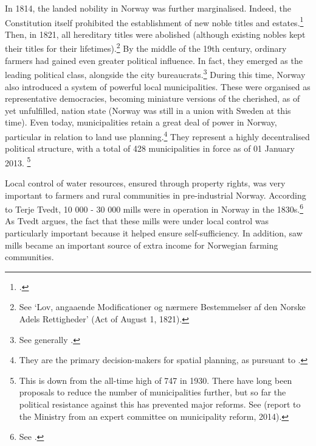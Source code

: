 In 1814, the landed nobility in Norway was further marginalised. Indeed, the Constitution itself prohibited the establishment of new noble titles and estates.\footcite[23|118]{c14} Then, in 1821, all hereditary titles were abolished (although existing nobles kept their titles for their lifetimes).\footnote{See `Lov, angaaende Modificationer og nærmere Bestemmelser af den Norske Adels Rettigheder' (Act of August 1, 1821).} By the middle of the 19th century, ordinary farmers had gained even greater political influence. In fact, they emerged as the leading political class, alongside the city bureaucrats.\footnote{See generally \cite{hommerstad14}.} During this time, Norway also introduced a system of powerful local municipalities. These were organised as representative democracies, becoming miniature versions of the cherished, as of yet unfulfilled, nation state (Norway was still in a union with Sweden at this time). Even today, municipalities retain a great deal of power in Norway, particular in relation to land use planning.\footnote{They are the primary decision-makers for spatial planning, as pursuant to \cite{pb08}.} They represent a highly decentralised political structure, with a total of 428 municipalities in force as of 01 January 2013. \footnote{This is down from the all-time high of 747 in 1930. There have long been proposals to reduce the number of municipalities further, but so far the political resistance against this has prevented major reforms. See \cite{kommuner14} (report to the Ministry from an expert committee on municipality reform, 2014).}

Local control of water resources, ensured through property rights, was very important to farmers and rural communities in pre-industrial Norway. According to Terje Tvedt, 10 000 - 30 000 mills were in operation in Norway in the 1830s.\footnote{See \cite[121]{tvedt13}.} As Tvedt argues, the fact that these mills were under local control was particularly important because it helped ensure self-sufficiency. In addition, saw mills became an important source of extra income for Norwegian farming communities.  %

